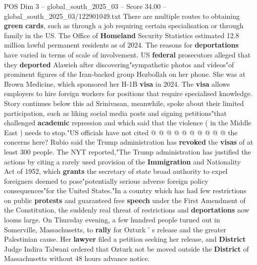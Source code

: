 \begin{textsample}{POS Dim 3 – global\_south\_2025\_03 – Score 34.00 – global\_south\_2025\_03/122901049.txt}
There are multiple routes to obtaining \textbf{green} \textbf{cards}, such as through a job requiring certain specialisation or through family in the US.
The Office of \textbf{Homeland} Security Statistics estimated 12.8 million lawful permanent residents as of 2024.
The reasons for \textbf{deportations} have varied in terms of scale of involvement.
US \textbf{federal} prosecutors alleged that they \textbf{deported} Alawieh after discovering"sympathetic photos and videos"of prominent figures of the Iran-backed group Hezbollah on her phone.
She was at Brown Medicine, which sponsored her H-1B \textbf{visa} in 2024.
The \textbf{visa} allows employers to hire foreign workers for positions that require specialised knowledge.
Story continues below this ad Srinivasan, meanwhile, spoke about their limited participation, such as liking social media posts and signing petitions"that challenged \textbf{academic} repression and which said that the violence ( in the Middle East ) needs to stop."US officials have not cited @ @ @ @ @ @ @ @ @ @ the concerns here?
Rubio said the Trump administration has \textbf{revoked} the \textbf{visas} of at least 300 people.
The NYT reported,"The Trump administration has justified the actions by citing a rarely used provision of the \textbf{Immigration} and Nationality Act of 1952, which \textbf{grants} the secretary of state broad authority to expel foreigners deemed to pose"potentially serious adverse foreign policy consequences"for the United States."In a country which has had few restrictions on public \textbf{protests} and guaranteed free \textbf{speech} under the First Amendment of the Constitution, the suddenly real threat of restrictions and \textbf{deportations} now looms large.
On Thursday evening, a few hundred people turned out in Somerville, Massachusetts, to \textbf{rally} for Ozturk ' s release and the greater Palestinian cause.
Her \textbf{lawyer} filed a petition seeking her release, and \textbf{District} Judge Indira Talwani ordered that Ozturk not be moved outside the \textbf{District} of Massachusetts without 48 hours advance notice.

\end{textsample}
